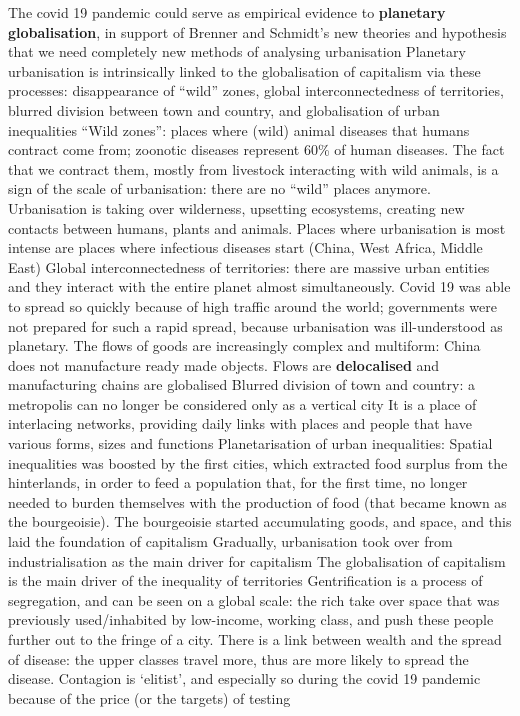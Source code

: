 \documentclass{article}
\begin{document}
\begin{outline}
	\1 The covid 19 pandemic could serve as empirical evidence to \textbf{planetary globalisation}, in support of Brenner and Schmidt's new theories and hypothesis that we need completely new methods of analysing urbanisation
	\1 Planetary urbanisation is intrinsically linked to the globalisation of capitalism via these processes: disappearance of ``wild'' zones, global interconnectedness of territories, blurred division between town and country, and globalisation of urban inequalities
	\1 ``Wild zones'': places where (wild) animal diseases that humans contract come from; zoonotic diseases represent 60\% of human diseases. The fact that we contract them, mostly from livestock interacting with wild animals, is a sign of the scale of urbanisation: there are no ``wild'' places anymore. Urbanisation is taking over wilderness, upsetting ecosystems, creating new contacts between humans, plants and animals.
		\2 Places where urbanisation is most intense are places where infectious diseases start (China, West Africa, Middle East)
	\1 Global interconnectedness of territories: there are massive urban entities and they interact with the entire planet almost simultaneously. 
		\2 Covid 19 was able to spread so quickly because of high traffic around the world; governments were not prepared for such a rapid spread, because urbanisation was ill-understood as planetary. 
		\2 The flows of goods are increasingly complex and multiform: China does not manufacture ready made objects. Flows are \textbf{delocalised} and manufacturing chains are globalised
	\1 Blurred division of town and country: a metropolis can no longer be considered only as a vertical city
		\2 It is a place of interlacing networks, providing daily links with places and people that have various forms, sizes and functions
	\1 Planetarisation of urban inequalities:
		\2 Spatial inequalities was boosted by the first cities, which extracted food surplus from the hinterlands, in order to feed a population that, for the first time, no longer needed to burden themselves with the production of food (that became known as the bourgeoisie). The bourgeoisie started accumulating goods, and space, and this laid the foundation of capitalism
		\2 Gradually, urbanisation took over from industrialisation as the main driver for capitalism The globalisation of capitalism is the main driver of the inequality of territories
		\2  Gentrification is a process of segregation, and can be seen on a global scale: the rich take over space that was previously used/inhabited by low-income, working class, and push these people further out to the fringe of a city.
		\2 There is a link between wealth and the spread of disease: the upper classes travel more, thus are more likely to spread the disease. Contagion is `elitist', and especially so during the covid 19 pandemic because of the price (or the targets) of testing
\end{outline}
\end{document}

